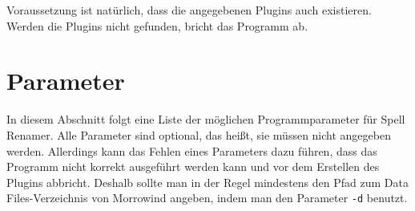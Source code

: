 \documentclass[12pt,oneside,a4paper]{article}
\begin{document}
Voraussetzung ist nat\"{u}rlich, dass die angegebenen Plugins auch existieren.
Werden die Plugins nicht gefunden, bricht das Programm ab.

\section{Parameter}
In diesem Abschnitt folgt eine Liste der m\"{o}glichen Programmparameter f\"{u}r Spell Renamer.
Alle Parameter sind optional, das hei\ss{}t, sie m\"{u}ssen nicht angegeben werden.
Allerdings kann das Fehlen eines Parameters dazu f\"{u}hren, dass das Programm nicht
korrekt ausgef\"{u}hrt werden kann und vor dem Erstellen des Plugins abbricht.
Deshalb sollte man in der Regel mindestens den Pfad zum Data Files-Verzeichnis
von Morrowind angeben, indem man den Parameter \texttt{-d} benutzt.
\newline
\end{document}

